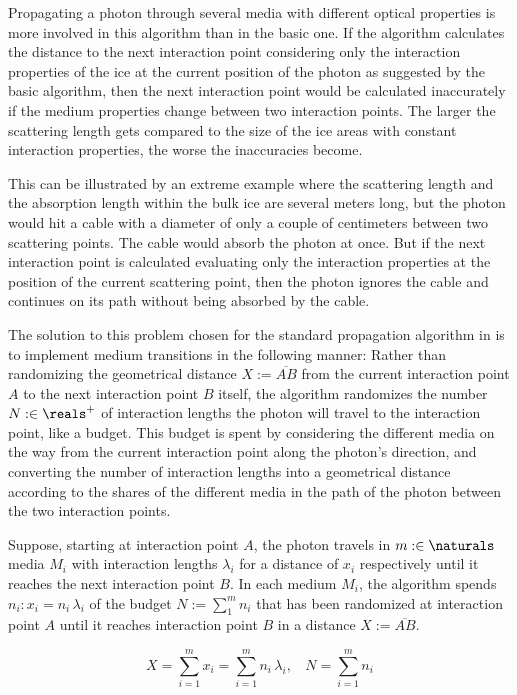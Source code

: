 Propagating a photon through several media with different optical properties is more involved in this algorithm than in the basic one.
If the algorithm calculates the distance to the next interaction point considering only the interaction properties of the ice at the current position of the photon as suggested by the basic algorithm, then the next interaction point would be calculated inaccurately if the medium properties change between two interaction points. The larger the scattering length gets compared to the size of the ice areas with constant interaction properties, the worse the inaccuracies become.

This can be illustrated by an extreme example where the scattering length and the absorption length within the bulk ice are several meters long, but the photon would hit a cable with a diameter of only a couple of centimeters between two scattering points. The cable would absorb the photon at once. But if the next interaction point is calculated evaluating only the interaction properties at the position of the current scattering point, then the photon ignores the cable and continues on its path without being absorbed by the cable.

The solution to this problem chosen for the standard propagation algorithm in \icecube is to implement medium transitions in the following manner:
Rather than randomizing the geometrical distance $X:=\overline{AB}$ from the current interaction point $A$ to the next interaction point $B$ itself, the algorithm randomizes the number $N :\in \reals^+$ of interaction lengths the photon will travel to the interaction point, like a budget. This budget is spent by considering the different media on the way from the current interaction point along the photon's direction, and converting the number of interaction lengths into a geometrical distance according to the shares of the different media in the path of the photon between the two interaction points.

Suppose, starting at interaction point $A$, the photon travels in $m :\in \naturals$ media $M_i$ with interaction lengths $\lambda_i$ for a distance of $x_i$ respectively until it reaches the next interaction point $B$. In each medium $M_i$, the algorithm spends $n_i: x_i = n_i\,\lambda_i$ of the budget $N:=\sum_1^m n_i$ that has been randomized at interaction point $A$ until it reaches interaction point $B$ in a distance $X:=\overline{AB}$.

\begin{equation}
  X = \sum_{i=1}^m x_i = \sum_{i=1}^m n_i\,\lambda_i, \ \ \ \ N = \sum_{i=1}^m n_i
  \label{eq:convertbudgettodistance}
\end{equation}

